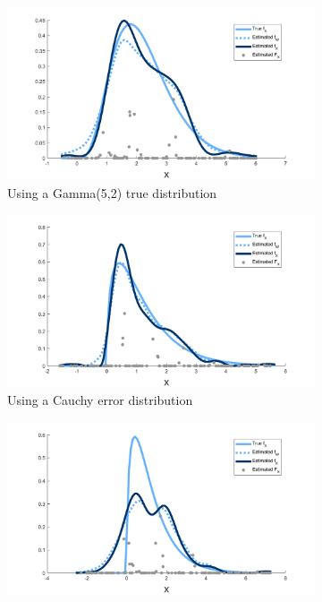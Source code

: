 \begin{figure}
	\begin{subfigure}[b]{0.49\textwidth}
		\centering
		\includegraphics[width = \textwidth]{Figures/Deconvolution/fixed_masses_example_Xgamma.png}
		\caption{Using a Gamma(5,2) true distribution}
		\label{fig:fixed masses example Xgamma}
	\end{subfigure}
	\hfill
	\begin{subfigure}[b]{0.49\textwidth}
		\centering
		\includegraphics[width = \textwidth]{Figures/Deconvolution/fixed_masses_example_Ucauchy.png}
		\caption{Using a Cauchy error distribution}
		\label{fig:fixed masses example Ucauchy}
	\end{subfigure}
	\begin{subfigure}[b]{0.49\textwidth}
		\centering
		\includegraphics[width = \textwidth]{Figures/Deconvolution/fixed_masses_example_NSR1.png}

\end{subfigure}
\end{figure}
